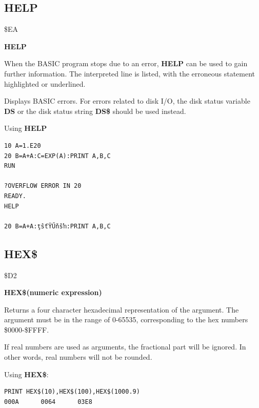 \subsection{HELP}
\begin{description}[leftmargin=2cm,style=nextline]
\item [Token:] \$EA
\item [Format:] {\bf HELP}
\item [Usage:]
   When the BASIC program stops due to an error,
   {\bf HELP} can be used to gain further information.
   The interpreted line is listed, with the
   erroneous statement highlighted or underlined.

\item [Remarks:]
      Displays BASIC errors. For errors related to disk
      I/O, the disk status variable {\bf DS}
      or the disk status string {\bf DS\$} should be used instead.

\item [Example:] Using {\bf HELP}
\begin{tcolorbox}[colback=black,coltext=white]
\verbatimfont{\codefont}
\begin{verbatim}
10 A=1.E20
20 B=A+A:C=EXP(A):PRINT A,B,C
RUN

?OVERFLOW ERROR IN 20
READY.
HELP

20 B=A+A:ţŝťŸŰňšŉ:PRINT A,B,C
\end{verbatim}
\end{tcolorbox}
\end{description}


\newpage
\subsection{HEX\$}
\begin{description}[leftmargin=2cm,style=nextline]
\item [Token:] \$D2
\item [Format:] {\bf HEX\$(numeric expression)}
\item [Usage:] Returns a four character hexadecimal
               representation of the argument.
               The argument must be in the range of 0-65535,
               corresponding to the hex numbers \$0000-\$FFFF.

\item [Remarks:] If real numbers are used as arguments, the
                 fractional part will be ignored. In other words, real numbers
                 will not be rounded.

\item [Example:] Using {\bf HEX\$}:
\begin{tcolorbox}[colback=black,coltext=white]
\verbatimfont{\codefont}
\begin{verbatim}
PRINT HEX$(10),HEX$(100),HEX$(1000.9)
000A      0064      03E8
\end{verbatim}
\end{tcolorbox}
\end{description}

